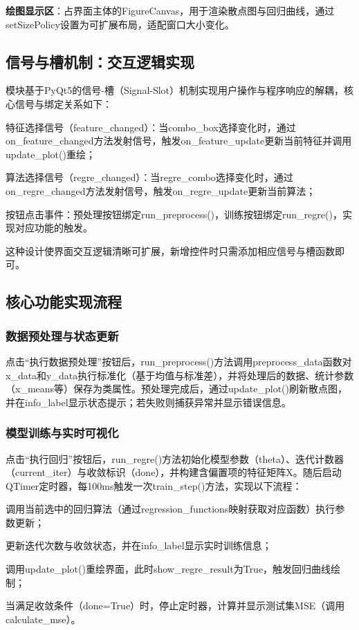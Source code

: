 \par  \textbf{绘图显示区}：占界面主体的FigureCanvas，用于渲染散点图与回归曲线，通过setSizePolicy设置为可扩展布局，适配窗口大小变化。

\subsection{信号与槽机制：交互逻辑实现}
模块基于PyQt5的信号-槽（Signal-Slot）机制实现用户操作与程序响应的解耦，核心信号与绑定关系如下：
\par  特征选择信号（feature\_changed）：当combo\_box选择变化时，通过on\_feature\_changed方法发射信号，触发on\_feature\_update更新当前特征并调用update\_plot()重绘；
\par 算法选择信号（regre\_changed）：当regre\_combo选择变化时，通过on\_regre\_changed方法发射信号，触发on\_regre\_update更新当前算法；
\par  按钮点击事件：预处理按钮绑定run\_preprocess()，训练按钮绑定run\_regre()，实现对应功能的触发。

这种设计使界面交互逻辑清晰可扩展，新增控件时只需添加相应信号与槽函数即可。

\subsection{核心功能实现流程}

\subsubsection{数据预处理与状态更新}
点击“执行数据预处理”按钮后，run\_preprocess()方法调用preprocess\_data函数对x\_data和y\_data执行标准化（基于均值与标准差），并将处理后的数据、统计参数（x\_means等）保存为类属性。预处理完成后，通过update\_plot()刷新散点图，并在info\_label显示状态提示；若失败则捕获异常并显示错误信息。

\subsubsection{模型训练与实时可视化}
点击“执行回归”按钮后，run\_regre()方法初始化模型参数（theta）、迭代计数器（current\_iter）与收敛标识（done），并构建含偏置项的特征矩阵X。随后启动QTimer定时器，每100ms触发一次train\_step()方法，实现以下流程：
\par 调用当前选中的回归算法（通过regression\_functions映射获取对应函数）执行参数更新；
\par  更新迭代次数与收敛状态，并在info\_label显示实时训练信息；
\par  调用update\_plot()重绘界面，此时show\_regre\_result为True，触发回归曲线绘制；
\par  当满足收敛条件（done=True）时，停止定时器，计算并显示测试集MSE（调用calculate\_mse）。

